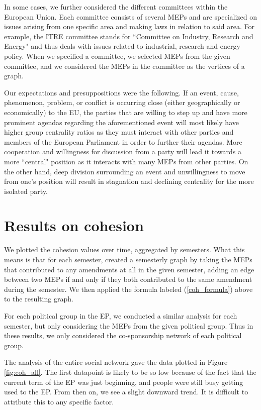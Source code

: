 \documentclass[lettersize,journal]{IEEEtran}
\begin{document}
In some cases, we further considered the different committees within the European Union. Each committee consists of several MEPs and are specialized on issues arising from one specific area and making laws in relation to said area. For example, the ITRE committee stands for ``Committee on Industry, Research and Energy" and thus deals with issues related to industrial, research and energy policy. When we specified a committee, we selected MEPs from the given committee, and we considered the MEPs in the committee as the vertices of a graph.

Our expectations and presuppositions were the following. If an event, cause, phenomenon, problem, or conflict is occurring close (either geographically or economically) to the EU, the parties that are willing to step up and have more prominent agendas regarding the aforementioned event will most likely have higher group centrality ratios as they must interact with other parties and members of the European Parliament in order to further their agendas. More cooperation and willingness for discussion from a party will lead it towards a more ``central" position as it interacts with many MEPs from other parties. On the other hand, deep division surrounding an event and unwillingness to move from one's position will result in stagnation and declining centrality for the more isolated party.

\section{Results on cohesion} \label{sec:results_coh}

We plotted the cohesion values over time, aggregated by semesters. What this means is that for each semester, created a semesterly graph by taking the MEPs that contributed to any amendments at all in the given semester, adding an edge between two MEPs if and only if they both contributed to the same amendment during the semester. We then applied the formula labeled (\ref{coh_formula}) above to the resulting graph.

For each political group in the EP, we conducted a similar analysis for each semester, but only considering the MEPs from the given political group. Thus in these results, we only considered the co-sponsorship network of each political group.

The analysis of the entire social network gave the data plotted in Figure \ref{fig:coh_all}. The first datapoint is likely to be so low because of the fact that the current term of the EP was just beginning, and people were still busy getting used to the EP. From then on, we see a slight downward trend. It is difficult to attribute this to any specific factor.
\end{document}
